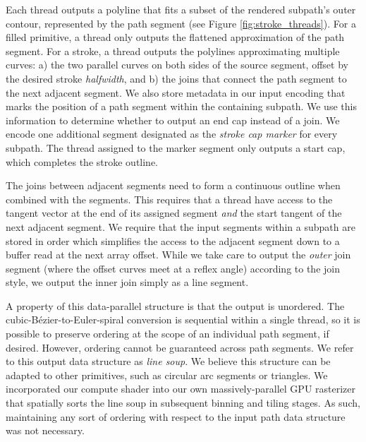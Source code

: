 \documentclass[sigconf, authordraft]{acmart}
\begin{document}
Each thread outputs a polyline that fits a subset of the rendered subpath's outer contour, represented by the path segment (see Figure \ref{fig:stroke_threads}). For a filled primitive, a thread only outputs the flattened approximation of the path segment. For a stroke, a thread outputs the polylines approximating multiple curves: a) the two parallel curves on both sides of the source segment, offset by the desired stroke \emph{halfwidth}, and b) the joins that connect the path segment to the next adjacent segment. We also store metadata in our input encoding that marks the position of a path segment within the containing subpath. We use this information to determine whether to output an end cap instead of a join. We encode one additional segment designated as the \emph{stroke cap marker} for every subpath. The thread assigned to the marker segment only outputs a start cap, which completes the stroke outline.

The joins between adjacent segments need to form a continuous outline when combined with the segments. This requires that a thread have access to the tangent vector at the end of its assigned segment \emph{and} the start tangent of the next adjacent segment. We require that the input segments within a subpath are stored in order which simplifies the access to the adjacent segment down to a buffer read at the next array offset. While we take care to output the \emph{outer} join segment (where the offset curves meet at a reflex angle) according to the join style, we output the inner join simply as a line segment.

A property of this data-parallel structure is that the output is unordered. The cubic-Bézier-to-Euler-spiral conversion is sequential within a single thread, so it is possible to preserve ordering at the scope of an individual path segment, if desired. However, ordering cannot be guaranteed across path segments. We refer to this output data structure as \emph{line soup}. We believe this structure can be adapted to other primitives, such as circular arc segments or triangles. We incorporated our compute shader into our own massively-parallel GPU rasterizer that spatially sorts the line soup in subsequent binning and tiling stages. As such, maintaining any sort of ordering with respect to the input path data structure was not necessary.
\end{document}
